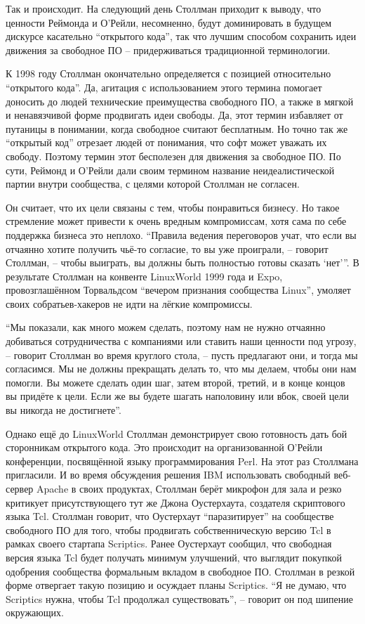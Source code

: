 Так и происходит. На следующий день Столлман приходит к выводу, что ценности Реймонда и О'Рейли, несомненно, будут доминировать в будущем дискурсе касательно \enquote{открытого кода}, так что лучшим способом сохранить идеи движения за свободное ПО -- придерживаться традиционной терминологии.

К 1998 году Столлман окончательно определяется с позицией относительно \enquote{открытого кода}. Да, агитация с использованием этого термина помогает доносить до людей технические преимущества свободного ПО, а также в мягкой и ненавязчивой форме продвигать идеи свободы. Да, этот термин избавляет от путаницы в понимании, когда свободное считают бесплатным. Но точно так же \enquote{открытый код} отрезает людей от понимания, что софт может уважать их свободу. Поэтому термин этот бесполезен для движения за свободное ПО. По сути, Реймонд и О'Рейли дали своим термином название неидеалистической партии внутри сообщества, с целями которой Столлман не согласен.

Он считает, что их цели связаны с тем, чтобы понравиться бизнесу. Но такое стремление может привести к очень вредным компромиссам, хотя сама по себе поддержка бизнеса это неплохо. \enquote{Правила ведения переговоров учат, что если вы отчаянно хотите получить чьё-то согласие, то вы уже проиграли, -- говорит Столлман, -- чтобы выиграть, вы должны быть полностью готовы сказать \enquote{нет}}. В результате Столлман на конвенте  LinuxWorld 1999 года и Expo, провозглашённом Торвальдсом \enquote{вечером признания сообщества Linux}, умоляет своих собратьев-хакеров не идти на лёгкие компромиссы.

\enquote{Мы показали, как много можем сделать, поэтому нам не нужно отчаянно добиваться сотрудничества с компаниями или ставить наши ценности под угрозу, -- говорит Столлман во время круглого стола, -- пусть предлагают они, и тогда мы согласимся. Мы не должны прекращать делать то, что мы делаем, чтобы они нам помогли. Вы можете сделать один шаг, затем второй, третий, и в конце концов вы придёте к цели. Если же вы будете шагать наполовину или вбок, своей цели вы никогда не достигнете}.

Однако ещё до LinuxWorld Столлман демонстрирует свою готовность дать бой сторонникам открытого кода. Это происходит на организованной О'Рейли конференции, посвящённой языку программирования Perl. На этот раз Столлмана пригласили. И во время обсуждения решения IBM использовать свободный веб-сервер Apache в своих продуктах, Столлман берёт микрофон для зала и резко критикует присутствующего тут же Джона Оустерхаута, создателя скриптового языка Tcl. Столлман говорит, что Оустерхаут \enquote{паразитирует} на сообществе свободного ПО для того, чтобы продвигать собственническую версию Tcl в рамках своего стартапа Scriptics. Ранее Оустерхаут сообщил, что свободная версия языка Tcl будет получать минимум улучшений, что выглядит покупкой одобрения сообщества формальным вкладом в свободное ПО. Столлман в резкой форме отвергает такую позицию и осуждает планы Scriptics. \enquote{Я не думаю, что Scriptics нужна, чтобы Tcl продолжал существовать}, -- говорит он под шипение окружающих.

